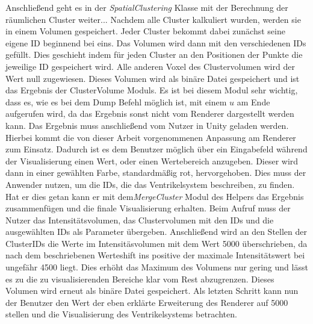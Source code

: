 \newline
Anschließend geht es in der \textit{SpatialClustering} Klasse mit der Berechnung der räumlichen Cluster weiter...
\newline
Nachdem alle Cluster kalkuliert wurden, werden sie in einem Volumen gespeichert. Jeder Cluster bekommt dabei zunächst seine eigene ID beginnend bei eins. Das Volumen wird dann mit den verschiedenen IDs gefüllt. Dies geschieht indem für jeden Cluster an den Positionen der Punkte die jeweilige ID gespeichert wird. Alle anderen Voxel des Clustervolumen wird der Wert null zugewiesen. Dieses Volumen wird als binäre Datei gespeichert und ist das Ergebnis der ClusterVolume Moduls. Es ist bei diesem Modul sehr wichtig, dass es, wie es bei dem Dump Befehl möglich ist, mit einem $u$ am Ende aufgerufen wird, da das Ergebnis sonst nicht vom Renderer dargestellt werden kann.
\newline
Das Ergebnis muss anschließend vom Nutzer in Unity geladen werden. Hierbei kommt die von dieser Arbeit vorgenommenen Anpassung am Renderer zum Einsatz. Dadurch ist es dem Benutzer möglich über ein Eingabefeld während der Visualisierung einen Wert, oder einen Wertebereich anzugeben. Dieser wird dann in einer gewählten Farbe, standardmäßig rot, hervorgehoben. Dies muss der Anwender nutzen, um die IDs, die das Ventrikelsystem beschreiben, zu finden.
\newline
Hat er dies getan kann er mit dem\textit{MergeCluster} Modul des Helpers das Ergebnis zusammenfügen und die finale Visualisierung erhalten. Beim Aufruf muss der Nutzer das Intensitätsvolumen, das Clustervolumen mit den IDs und die ausgewählten IDs als Parameter übergeben. Anschließend wird an den Stellen der ClusterIDs die Werte im Intensitäsvolumen mit dem Wert 5000 überschrieben, da nach dem beschriebenen Werteshift ins positive der maximale Intensitätswert bei ungefähr 4500 liegt. Dies erhöht das Maximum des Volumens nur gering und lässt es zu die zu visualisierenden Bereiche klar vom Rest abzugrenzen. Dieses Volumen wird erneut als binäre Datei gespeichert.
\newline
Als letzten Schritt kann nun der Benutzer den Wert der eben erklärte Erweiterung des Renderer auf 5000 stellen und die Visualisierung des Ventrikelsystems betrachten.













































